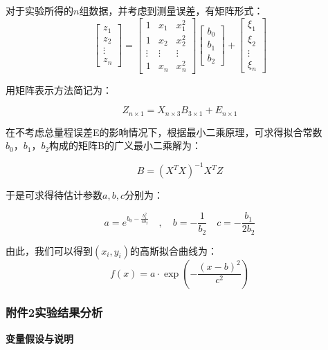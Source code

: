 \documentclass[withoutpreface,bwprint]{cumcmthesis} %
\begin{document}
对于实验所得的$n$组数据，并考虑到测量误差，有矩阵形式：
\begin{equation*}
	\left[\begin{array}{l}
		z_{1} \\
		z_{2} \\
		\vdots \\
		z_{n}
	\end{array}\right]=\left[\begin{array}{ccc}
		1 & x_{1} & x_{1}^{2} \\
		1 & x_{2} & x_{2}^{2} \\
		\vdots & \vdots & \vdots \\
		1 & x_{n} & x_{n}^{2}
	\end{array}\right]\left[\begin{array}{c}
		b_{0} \\
		b_{1} \\
		b_{2}
	\end{array}\right]+\left[\begin{array}{c}
		\xi_{1} \\
		\xi_{2} \\
		\vdots \\
		\xi_{n}
	\end{array}\right]
\end{equation*}

用矩阵表示方法简记为：

\begin{equation*}
	Z_{n \times 1}=X_{n \times 3} B_{3 \times 1}+E_{n \times 1}
\end{equation*}

在不考虑总量程误差E的影响情况下，根据最小二乘原理，可求得拟合常数$b_0，b_1，b_2$构成的矩阵B的广义最小二乘解为：

\begin{equation*}
	B=\left(X^{T} X\right)^{-1} X^{T} Z
\end{equation*}

于是可求得待估计参数$a,b,c$分别为：

\begin{equation}
	a=e^{b_{0}-\frac{b_{1}^{2}}{4 b_{2}}} \quad, \quad b=-\frac{1}{b_{2}} \quad c=-\frac{b_{1}}{2 b_{2}}
\end{equation}

由此，我们可以得到$(x_i,y_i)$的高斯拟合曲线为：
\begin{equation}
		f(x) =a \cdot \exp \left(-\frac{(x -b)^{2}}{c^2}\right)
\end{equation}

\subsubsection{附件2实验结果分析}
\textbf{变量假设与说明}
\end{document}
